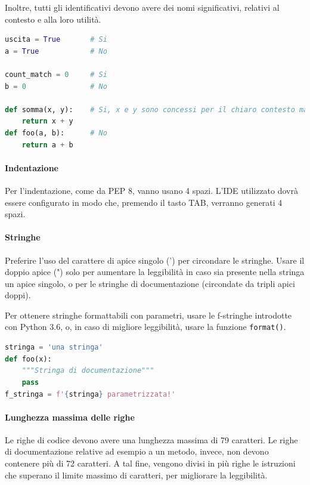 		Inoltre, tutti gli identificativi devono avere dei nomi significativi, relativi al contesto e alla loro utilità.
\begin{lstlisting}[language=Python]
uscita = True		# Si
a = True			# No

count_match = 0		# Si
b = 0				# No

def somma(x, y):	# Si, x e y sono concessi per il chiaro contesto matematico
	return x + y
def foo(a, b):		# No
	return a + b
\end{lstlisting}

        \paragraph{Indentazione}\label{PP:Sviluppo:Codifica:Indentazione}
		Per l'indentazione, come da PEP 8, vanno usano 4 spazi. L'IDE utilizzato dovrà essere configurato in modo che, premendo il
		tasto TAB, verranno generati 4 spazi.

		\paragraph{Stringhe}\label{PP:Sviluppo:Codifica:Stringhe}
		Preferire l'uso del carattere di apice singolo (') per circondare le stringhe. Usare il doppio apice (") solo per aumentare la
		leggibilità in caso sia presente nella stringa un apice singolo, o per le stringhe di documentazione (circondate da tripli apici doppi).\par
		Per ottenere stringhe formattabili con parametri, usare le f-stringhe introdotte con Python 3.6, o, in caso di migliore leggibilità, usare la funzione \texttt{format()}.

\begin{lstlisting}[language=Python]
stringa = 'una stringa'
def foo(x):
	"""Stringa di documentazione"""
	pass
f_stringa = f'{stringa} parametrizzata!'
\end{lstlisting}

        \paragraph{Lunghezza massima delle righe}\label{PP:Sviluppo:Codifica:LunghezzaMassimaDelleRighe}
		Le righe di codice devono avere una lunghezza massima di 79 caratteri. Le righe di documentazione relative ad esempio a un metodo,
		invece, non devono contenere più di 72 caratteri.
		A tal fine, vengono divisi in più righe le istruzioni che superano il limite massimo di caratteri, per migliorare la leggibilità.

